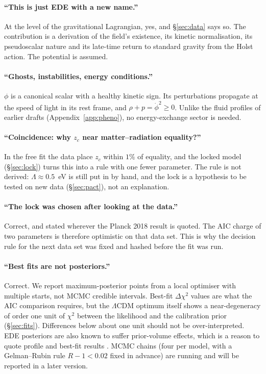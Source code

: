 \documentclass[11pt]{article}
\begin{document}
\paragraph{``This is just EDE with a new name.''} At the level of the gravitational
Lagrangian, yes, and \S\ref{sec:data} says so. The contribution is a derivation of the
field's existence, its kinetic normalisation, its pseudoscalar nature and its
late-time return to standard gravity from the Holst action. The potential is assumed.

\paragraph{``Ghosts, instabilities, energy conditions.''} $\phi$ is a canonical scalar
with a healthy kinetic sign. Its perturbations propagate at the speed of light in its rest
frame, and $\rho+p=\dot\phi^2\ge0$. Unlike the fluid profiles of earlier drafts
(Appendix~\ref{app:pheno}), no energy-exchange sector is needed.

\paragraph{``Coincidence: why $z_c$ near matter--radiation equality?''} In the free fit the
data place $z_c$ within $1\%$ of equality, and the locked model (\S\ref{sec:lock}) turns this
into a rule with one fewer parameter. The rule is not derived: $\Lambda\approx0.5$~eV is
still put in by hand, and the lock is a hypothesis to be tested on new data
(\S\ref{sec:pact}), not an explanation.

\paragraph{``The lock was chosen after looking at the data.''} Correct, and stated wherever
the Planck 2018 result is quoted. The AIC charge of two parameters is therefore optimistic
on that data set. This is why the decision rule for the next data set was fixed and hashed
before the fit was run.

\paragraph{``Best fits are not posteriors.''} Correct. We report maximum-posterior points
from a local optimiser with multiple starts, not MCMC credible intervals. Best-fit
$\Delta\chi^2$ values are what the AIC comparison requires, but the $\Lambda$CDM optimum
itself shows a near-degeneracy of order one unit of $\chi^2$ between the likelihood and the
calibration prior (\S\ref{sec:fits}). Differences below about one unit should not be
over-interpreted. EDE posteriors are also known to suffer prior-volume effects, which is a
reason to quote profile and best-fit results \cite{poulin2025}. MCMC chains (four per model, with a
Gelman--Rubin rule $R-1<0.02$ fixed in advance) are running and will be reported in a later version.
\end{document}
